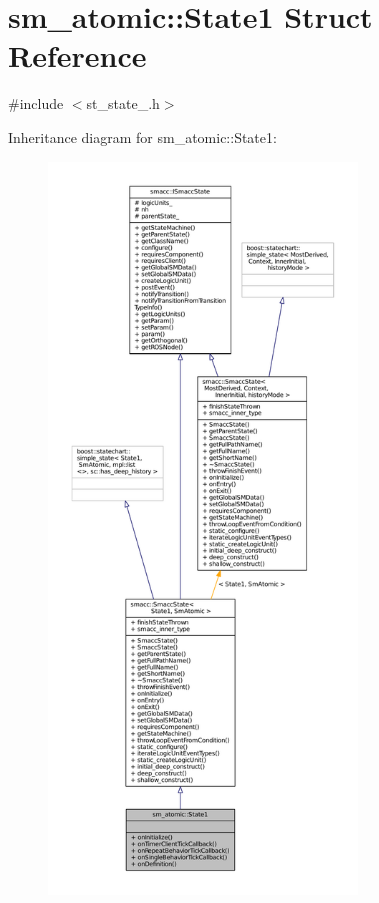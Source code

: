\hypertarget{structsm__atomic_1_1State1}{}\section{sm\+\_\+atomic\+:\+:State1 Struct Reference}
\label{structsm__atomic_1_1State1}


{\ttfamily \#include $<$st\+\_\+state\+\_.\+h$>$}



Inheritance diagram for sm\+\_\+atomic\+:\+:State1\+:
\nopagebreak
\begin{figure}[H]
\begin{center}
\leavevmode
\includegraphics[height=550pt]{structsm__atomic_1_1State1__inherit__graph}
\end{center}
\end{figure}


